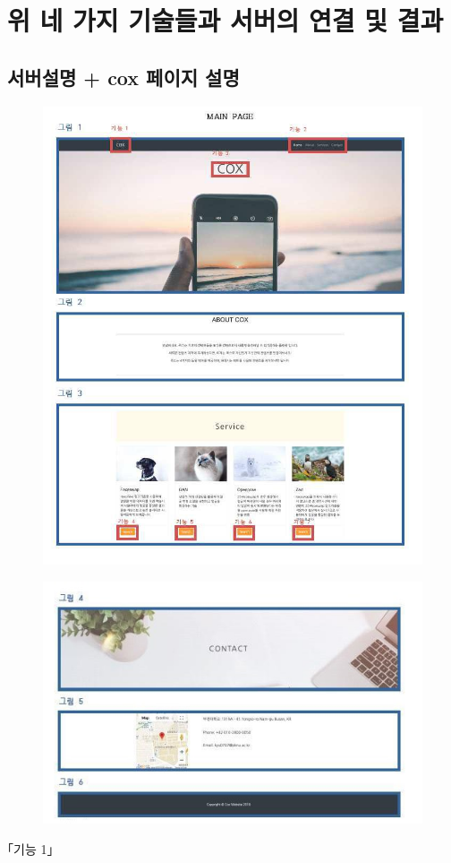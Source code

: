 \documentclass[chapter,oneside]{oblivoir}
\begin{document}
\chapter{ 위 네 가지 기술들과 서버의 연결 및 결과  }

\section{ 서버설명 + cox 페이지 설명}


\begin{figure}[h!]
    \centering
    \includegraphics{pic/chp6/img921}
\end{figure}
\newpage
\begin{figure}[h!]
    \centering
    \includegraphics{pic/chp6/img928}
\end{figure}
｢기능 1｣
\end{document}

